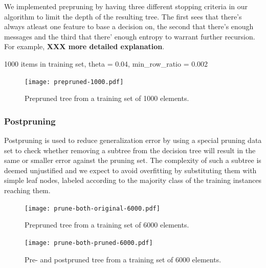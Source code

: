 \documentclass[a4paper,10pt]{article}
\newcommand{\XXX}[1]{{\bf XXX #1}}
\begin{document}
We implemented prepruning by having three different stopping criteria in
our algorithm to limit the depth of the resulting tree.  The first sees
that there's always atleast one feature to base a decision on, the second
that there's enough messages and the third that there' enough entropy to
warrant further recursion.  For example, \XXX{more detailed explanation}.

1000 items in training set, theta = 0.04, min\_row\_ratio = 0.002

\begin{figure}[h]
  \centering
  \begin{minipage}[c]{1.0\textwidth}
    \centering
\texttt{[image: prepruned-1000.pdf]}
  \end{minipage}
  \caption{Prepruned tree from a training set of 1000 elements.}
  \label{fig:prepruned-1000}
\end{figure}

\subsubsection{Postpruning}
\label{sect:postpruning}

Postpruning is used to reduce generalization error by using a special
pruning data set to check whether removing a subtree from the decision
tree will result in the same or smaller error against the pruning set.
The complexity of such a subtree is deemed unjustified and we expect
to avoid overfitting by substituting them with simple leaf nodes,
labeled according to the majority class of the training instances
reaching them\cite[p. 194 mun kirjassa]{alpaydin2004}.

\begin{figure}[h]
  \centering
  \begin{minipage}[c]{1.0\textwidth}
    \centering

\texttt{[image: prune-both-original-6000.pdf]}
  \end{minipage}
  \caption{Prepruned tree from a training set of 6000 elements.}
  \label{fig:prune-both-original-6000}
\end{figure}

\begin{figure}[h]
  \centering
  \begin{minipage}[c]{1.0\textwidth}
    \centering

\texttt{[image: prune-both-pruned-6000.pdf]}
  \end{minipage}
  \caption{Pre- and postpruned tree from a training set of 6000 elements.}
  \label{fig:prune-both-pruned-6000}
\end{figure}
\end{document}
